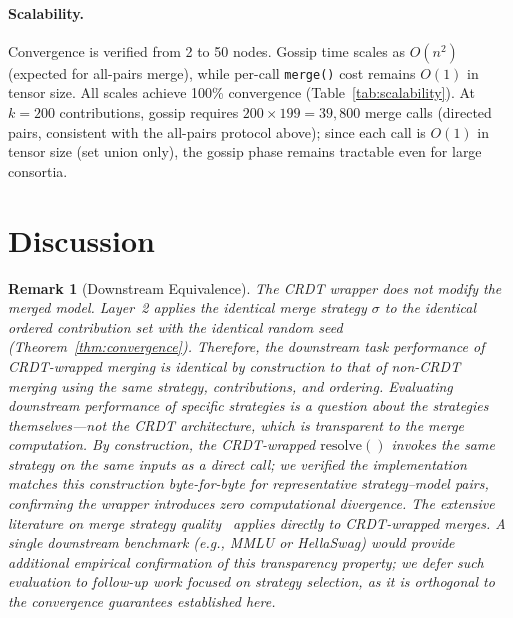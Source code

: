 \documentclass[10pt,letterpaper]{article}
\newtheorem{remark}[theorem]{Remark}
\begin{document}
\paragraph{Scalability.}
Convergence is verified from 2 to 50 nodes.
Gossip time scales as $O(n^2)$ (expected for all-pairs merge), while per-call \texttt{merge()} cost remains $O(1)$ in tensor size.
All scales achieve 100\% convergence (Table~\ref{tab:scalability}).
At $k{=}200$ contributions, gossip requires $200 \times 199 = 39{,}800$ merge calls (directed pairs, consistent with the all-pairs protocol above); since each call is $O(1)$ in tensor size (set union only), the gossip phase remains tractable even for large consortia.

\section{Discussion}


\begin{remark}[Downstream Equivalence]\label{rem:downstream}
The CRDT wrapper does not modify the merged model.
Layer~2 applies the identical merge strategy $\sigma$ to the identical ordered contribution set with the identical random seed (Theorem~\ref{thm:convergence}).
Therefore, the downstream task performance of CRDT-wrapped merging is identical by construction to that of non-CRDT merging using the same strategy, contributions, and ordering.
Evaluating downstream performance of specific strategies is a question about the strategies themselves---not the CRDT architecture, which is transparent to the merge computation.
By construction, the CRDT-wrapped $\mathrm{resolve}()$ invokes the same strategy on the same inputs as a direct call; we verified the implementation matches this construction byte-for-byte for representative strategy--model pairs, confirming the wrapper introduces zero computational divergence.
The extensive literature on merge strategy quality~\cite{yang2024survey, wortsman2022model, ilharco2023editing, yadav2023ties, yu2024dare, matena2022merging, akiba2025evolutionary, goddard2024mergekit} applies directly to CRDT-wrapped merges.
A single downstream benchmark (e.g., MMLU or HellaSwag) would provide additional empirical confirmation of this transparency property; we defer such evaluation to follow-up work focused on strategy selection, as it is orthogonal to the convergence guarantees established here.
\end{remark}
\end{document}
